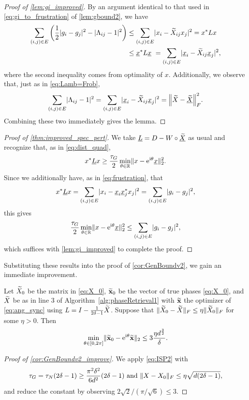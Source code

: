 \begin{proof}[Proof of \cref{lem:gi_improved}]
  By an argument identical to that used in \eqref{eq:gi_to_frustration} of \cref{lem:gbound2}, we have \begin{align*}\sum_{(i, j) \in E}  \left(\frac{1}{2} |g_i - g_j|^2 - |\Lambda_{ij} - 1|^2\right) &\le \sum_{(i, j) \in E}  \lvert x_i - \widetilde{X}_{ij} x_j\rvert^2 = x^* L x \\ &\le \underline{x}^* L \underline{x} \ = \sum_{(i, j) \in E}  \lvert\underline{x}_i - \widetilde{X}_{ij} \underline{x}_j\rvert^2,\end{align*} where the second inequality comes from optimality of $x$.  Additionally, we observe that, just as in \eqref{eq:Lamb=Frob}, \[\sum_{(i, j) \in E} \abs{\Lambda_{ij} - 1}^2 = \sum_{(i, j) \in E}  \abs{\ux_i - \tX_{ij} \ux_j}^2 = \norm*{\tX - \utX}_F^2.\]  Combining these two immediately gives the lemma.
\end{proof}

\begin{proof}[Proof of \cref{thm:improved_spec_pert}]
  We take $\underline{L} = D - W \circ \underline{\widetilde{X}}$ as usual and recognize that, as in \eqref{eq:dist_quad}, \[x^* \underline{L} x \ge \frac{\tau_G}{2} \min_{\theta \in \mathbb{R}} \lVert x - \mathrm{e}^{\mathrm{i}\theta} \underline{x}\rVert_2^2.\]  Since we additionally have, as in \eqref{eq:frustration}, that \[x^* \underline{L} x = \sum_{(i, j) \in E} \lvert x_i - \underline{x}_i \underline{x}_j^* x_j\rvert^2 = \sum_{(i, j) \in E}\lvert g_i - g_j\rvert^2,\] this gives \[\frac{\tau_G}{2} \min_{\theta \in \mathbb{R}} \lVert x - \mathrm{e}^{\mathrm{i}\theta} \underline{x}\rVert_2^2 \le \sum_{(i, j) \in E}\lvert g_i - g_j\rvert^2,\] which suffices with \cref{lem:gi_improved} to complete the proof.
\end{proof}

Substituting these results into the proof of \cref{cor:GenBoundv2}, we gain an immediate improvement.

\begin{corollary}
  Let $\widetilde{X}_0$ be the matrix in \eqref{eq:X_0}, $\widetilde{\mathbf{x}}_0$ be the vector of true phases \eqref{eq:X_0}, and $\widetilde{X}$ be as in line 3 of Algorithm~\ref{alg:phaseRetrieval1} with $\widetilde{\mathbf{x}}$ the optimizer of \eqref{eq:ang_sync} using $L = I - \frac{1}{2 \delta - 1} \widetilde{X}$.  Suppose that $\lVert\widetilde{X}_0 - \widetilde{X}\rVert_F \le \eta \lVert\widetilde{X}_0\rVert_F$ for some $\eta > 0$.  Then
  \[\min_{\theta\in[0,2\pi]} \lVert\widetilde{\mathbf{x}}_0 - \mathrm{e}^{\mathrm{i} \theta} \widetilde{\mathbf{x}}\rVert_2 \le 3 \dfrac{\eta d^{\frac{3}{2}}}{\delta}.\]
  \label{cor:GenBoundv2_improve}
\end{corollary}

\begin{proof}[Proof of \cref{cor:GenBoundv2_improve}]
  We apply \eqref{eq:ISP2} with \[\tau_G = \tau_N(2 \delta - 1) \ge \frac{\pi^2 \delta^2}{6 d^2}(2 \delta - 1) \ \text{and} \ \norm{X - X_0}_F \le \eta \sqrt{d (2 \delta - 1)},%
  \] and reduce the constant by observing $2 \sqrt{2} / (\pi / \sqrt{6}) \le 3$.
\end{proof}

